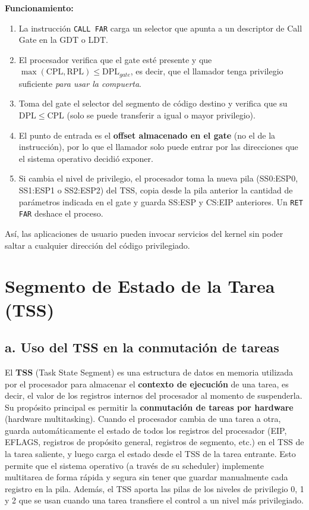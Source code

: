 \documentclass[RT]{UTNLSE}
\begin{document}
\textbf{Funcionamiento:}
\begin{enumerate}
    \item La instrucción \texttt{CALL FAR} carga un selector que apunta a un descriptor de Call Gate en la GDT o LDT.
    \item El procesador verifica que el gate esté presente y que \(\max(\mathrm{CPL},\mathrm{RPL})\leq \mathrm{DPL}_{gate}\), es decir, que el llamador tenga privilegio suficiente \emph{para usar la compuerta}.
    \item Toma del gate el selector del segmento de código destino y verifica que su \(\mathrm{DPL}\leq\mathrm{CPL}\) (solo se puede transferir a igual o mayor privilegio).
    \item El punto de entrada es el \textbf{offset almacenado en el gate} (no el de la instrucción), por lo que el llamador solo puede entrar por las direcciones que el sistema operativo decidió exponer.
    \item Si cambia el nivel de privilegio, el procesador toma la nueva pila (SS0:ESP0, SS1:ESP1 o SS2:ESP2) del TSS, copia desde la pila anterior la cantidad de parámetros indicada en el gate y guarda SS:ESP y CS:EIP anteriores. Un \texttt{RET FAR} deshace el proceso.
\end{enumerate}
Así, las aplicaciones de usuario pueden invocar servicios del kernel sin poder saltar a cualquier dirección del código privilegiado.

\section{Segmento de Estado de la Tarea (TSS)}

\subsection*{a. Uso del TSS en la conmutación de tareas}
El \textbf{TSS} (Task State Segment) es una estructura de datos en memoria utilizada por el procesador para almacenar el \textbf{contexto de ejecución} de una tarea, es decir, el valor de los registros internos del procesador al momento de suspenderla.
Su propósito principal es permitir la \textbf{conmutación de tareas por hardware} (hardware multitasking). Cuando el procesador cambia de una tarea a otra, guarda automáticamente el estado de todos los registros del procesador (EIP, EFLAGS, registros de propósito general, registros de segmento, etc.) en el TSS de la tarea saliente, y luego carga el estado desde el TSS de la tarea entrante. Esto permite que el sistema operativo (a través de su scheduler) implemente multitarea de forma rápida y segura sin tener que guardar manualmente cada registro en la pila. Además, el TSS aporta las pilas de los niveles de privilegio 0, 1 y 2 que se usan cuando una tarea transfiere el control a un nivel más privilegiado.
\end{document}
